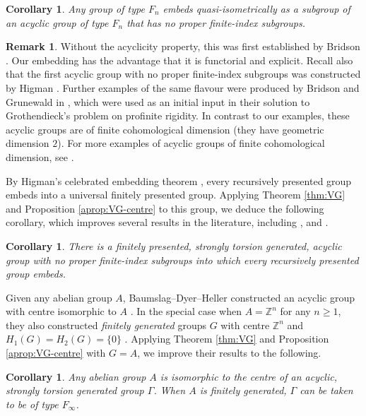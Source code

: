 \documentclass[10pt,a4paper]{amsart}
\numberwithin{equation}{section}
\numberwithin{figure}{section}
\newtheorem{cor}[thm]{Corollary}
\theoremstyle{definition}
\newtheorem{rem}[thm]{Remark}
\newcommand{\bZ}{\mathbb{Z}}
\renewcommand{\geq}{\geqslant}
\begin{document}
\begin{cor}
Any group of type $F_n$ embeds quasi-isometrically as a subgroup of an acyclic group of type $F_n$ that has no proper finite-index subgroups.
\end{cor}

\begin{rem}
Without the acyclicity property, this was first established by Bridson \cite{Bridson98}. Our embedding has the advantage that it is functorial and explicit. Recall also that the first acyclic group with no proper finite-index subgroups was constructed by Higman \cite{Higman51}. Further examples of the same flavour were produced by Bridson and Grunewald in \cite[\S 4]{BridsonGrunewald04}, which were used as an initial input in their solution to Grothendieck's problem on profinite rigidity. In contrast to our examples, these acyclic groups are of finite cohomological dimension (they have geometric dimension $2$). For more examples of acyclic groups of finite cohomological dimension, see \cite{BerrickHillman03}. 
\end{rem}

By Higman's celebrated embedding theorem \cite{Higman1961}, every recursively presented group embeds into a universal finitely presented group. Applying Theorem \ref{thm:VG} and Proposition \ref{aprop:VG-centre} to this group, we deduce the following corollary, which improves several results in the literature, including \cite[Theorem E]{BauDyMi83}, \cite[Theorem 6]{BerrickMiller92} and \cite[Theorem A]{Bridson20}.

\begin{cor}
There is a finitely presented, strongly torsion generated, acyclic group with no proper finite-index subgroups into which every recursively presented group embeds.
\end{cor}

Given any abelian group $A$, Baumslag--Dyer--Heller constructed an acyclic group with centre isomorphic to $A$ \cite[Theorem 7.1]{BauDyHe80}. In the special case when $A = \bZ^n$ for any $n\geq 1$, they also constructed \emph{finitely generated} groups $G$ with centre $\bZ^n$ and $H_1(G)=H_2(G) = \{0\}$ \cite[Theorem 7.4]{BauDyHe80}. Applying Theorem \ref{thm:VG} and Proposition \ref{aprop:VG-centre} with $G=A$, we improve their results to the following.

\begin{cor}
Any abelian group $A$ is isomorphic to the centre of an acyclic, strongly torsion generated group $\Gamma$. When $A$ is finitely generated, $\Gamma$ can be taken to be of type $F_\infty$.
\end{cor}
\end{document}
